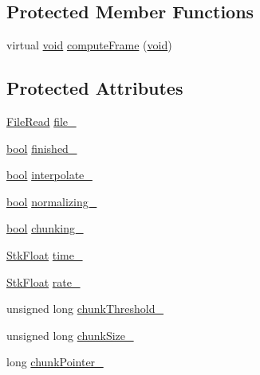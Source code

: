 \subsection*{Protected Member Functions}
\begin{DoxyCompactItemize}
\item 
virtual \hyperlink{sound_8c_ae35f5844602719cf66324f4de2a658b3}{void} \hyperlink{class_nyq_1_1_file_wv_in_a1aa2dbb0b803e3566daf50016895767b}{compute\+Frame} (\hyperlink{sound_8c_ae35f5844602719cf66324f4de2a658b3}{void})
\end{DoxyCompactItemize}
\subsection*{Protected Attributes}
\begin{DoxyCompactItemize}
\item 
\hyperlink{class_nyq_1_1_file_read}{File\+Read} \hyperlink{class_nyq_1_1_file_wv_in_aca8d20b15a2debb70937d7ba56ea78a5}{file\+\_\+}
\item 
\hyperlink{mac_2config_2i386_2lib-src_2libsoxr_2soxr-config_8h_abb452686968e48b67397da5f97445f5b}{bool} \hyperlink{class_nyq_1_1_file_wv_in_a3aa42220d4f55109b2b776fe1a290490}{finished\+\_\+}
\item 
\hyperlink{mac_2config_2i386_2lib-src_2libsoxr_2soxr-config_8h_abb452686968e48b67397da5f97445f5b}{bool} \hyperlink{class_nyq_1_1_file_wv_in_a98ab139d91bf418ad8924e8c442c3ba6}{interpolate\+\_\+}
\item 
\hyperlink{mac_2config_2i386_2lib-src_2libsoxr_2soxr-config_8h_abb452686968e48b67397da5f97445f5b}{bool} \hyperlink{class_nyq_1_1_file_wv_in_a1d47b1764e3a5dacf854c16938b87119}{normalizing\+\_\+}
\item 
\hyperlink{mac_2config_2i386_2lib-src_2libsoxr_2soxr-config_8h_abb452686968e48b67397da5f97445f5b}{bool} \hyperlink{class_nyq_1_1_file_wv_in_ac27a2fbf1af9d7aeebb9b39b1cc014cc}{chunking\+\_\+}
\item 
\hyperlink{namespace_nyq_a044fa20a706520a617bbbf458a7db7e4}{Stk\+Float} \hyperlink{class_nyq_1_1_file_wv_in_ad1cb7657e576ff43e45bbb91d2843962}{time\+\_\+}
\item 
\hyperlink{namespace_nyq_a044fa20a706520a617bbbf458a7db7e4}{Stk\+Float} \hyperlink{class_nyq_1_1_file_wv_in_a6b24c039931db2ee445af7b024c4a692}{rate\+\_\+}
\item 
unsigned long \hyperlink{class_nyq_1_1_file_wv_in_a7f31a969df60ffba59dc789a6e8aed97}{chunk\+Threshold\+\_\+}
\item 
unsigned long \hyperlink{class_nyq_1_1_file_wv_in_a5274ad9eca9e1db6092d0b9642e48176}{chunk\+Size\+\_\+}
\item 
long \hyperlink{class_nyq_1_1_file_wv_in_ad5727fd25c2519e5a1b67c6383849781}{chunk\+Pointer\+\_\+}
\end{DoxyCompactItemize}

